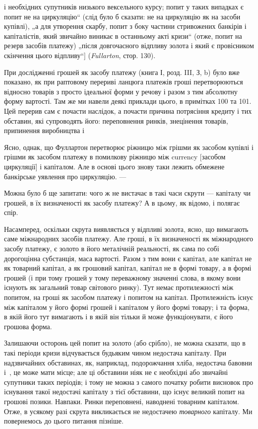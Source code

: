 \parcont{}  %
і необхідних супутників низького вексельного курсу; попит у таких
випадках є попит не на циркуляцію“ (слід було б сказати:
не на циркуляцію як на засоби купівлі), „а для утворення скарбу,
попит з боку частини стривожених банкірів і капіталістів, який
звичайно виникає в останньому акті кризи“ (отже, попит на резерв
засобів платежу) „після довгочасного відпливу золота і який є
провісником скінчення цього відпливу“] (\emph{Fullarton}, стор. 130).

При дослідженні грошей як засобу платежу (книга І, розд. III,
З, b) було вже показано, як при раптовому перериві ланцюга платежів
гроші перетворюються відносно товарів з просто ідеальної
форми у речову і разом з тим абсолютну форму вартості.
Там же ми навели деякі приклади цього, в примітках 100 та 101.
Цей перерив сам є почасти наслідок, а почасти причина потрясіння
кредиту і тих обставин, які супроводять його: переповнення
ринків, знецінення товарів, припинення виробництва і~

Ясно, однак, що Фуллартон перетворює ріжницю між грішми як
засобом купівлі і грішми як засобом платежу в помилкову ріжницю
між currency [засобом циркуляції] і капіталом. Але в основі
цього знову таки лежить обмежене банкірське уявлення про
циркуляцію. —

Можна було б ще запитати: чого ж не вистачає в такі часи
скрути — капіталу чи грошей, в їх визначеності як засобу платежу?
А в цьому, як відомо, і полягає спір.

Насамперед, оскільки скрута виявляється у відпливі золота,
ясно, що вимагають саме міжнародних засобів платежу. Але
гроші, в їх визначеності як міжнародного засобу платежу, є
золото в його металічній реальності, як сама по собі дорогоцінна
субстанція, маса вартості. Разом з тим вони є капітал, але капітал
не як товарний капітал, а як грошовий капітал, капітал не
в формі товару, а в формі грошей (і при тому грошей у тому
переважному значенні слова, в якому вони існують як загальний
товар світового ринку). Тут немає протилежності між попитом,
на гроші як засобом платежу і попитом на капітал. Протилежність
існує між капіталом у його формі грошей і капіталом у
його формі товару; і та форма, в якій його тут вимагають і в
якій він тільки й може функціонувати, є його грошова форма.

Залишаючи осторонь цей попит на золото (або срібло), не
можна сказати, що в такі періоди кризи відчувається будьяким
чином недостача капіталу. При надзвичайних обставинах, як,
наприклад, подорожчання хліба, недостача бавовни і~, це
може мати місце; але ці обставини ніяк не є необхідні або звичайні
супутники таких періодів; і тому не можна з самого початку
робити висновок про існування такої недостачі капіталу
з тієї обставини, що існує великий попит на грошові позики.
Навпаки. Ринки переповнені, наводнені товарним капіталом.
Отже, в усякому разі скрута викликається не недостачею \emph{товарного}
капіталу. Ми повернемось до цього питання пізніше.
\parbreak{}  %

